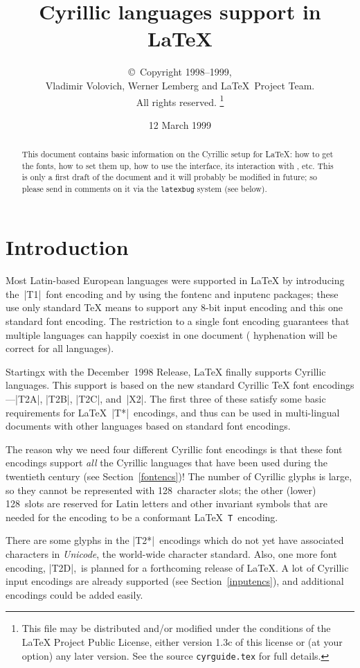 \documentclass{ltxguide}[1999/02/28]
\title{Cyrillic languages support in \LaTeX}
\author{\copyright~Copyright 1998--1999,\\ Vladimir Volovich,
        Werner Lemberg and \LaTeX\ Project Team.\\ All rights reserved.%
        \footnote{This file may be distributed and/or modified under the
          conditions of the \LaTeX{} Project Public License, either version 1.3c
          of this license or (at your option) any later version. See the source
         \texttt{cyrguide.tex} for full details.}%
}
\date{12 March 1999}
\begin{document}
\maketitle
\tableofcontents

\begin{abstract}
  This document contains basic information on the Cyrillic setup for
  \LaTeX{}: how to get the fonts, how to set them up, how to use
  the interface, its interaction with \babel{}, etc. This is only a first
  draft of the document and it will probably be modified in future; so
  please send in comments on it via the \texttt{latexbug} system
  (see below).
\end{abstract}


\section{Introduction}

Most Latin-based European languages were supported in \LaTeX{} by
introducing the~|T1|~font encoding and by using the \textsf{fontenc}
and \textsf{inputenc} packages; these use only standard \TeX{} means
to support any \mbox{8-bit} input encoding and this one standard font
encoding.  The restriction to a single font encoding guarantees that
multiple languages can happily coexist in one document (\eg
hyphenation will be correct for all languages).

Startingx with the December~1998 Release, \LaTeX{} finally supports
Cyrillic languages.  This support is based on the new standard
Cyrillic \TeX{} font encodings---|T2A|, |T2B|, |T2C|, and~|X2|.  The
first three of these satisfy some basic requirements for
\LaTeX{}~|T*|~encodings, and thus can be used in multi-lingual documents
with other languages based on standard font encodings.

The reason why we need four different Cyrillic font encodings is that
these font encodings support \emph{all} the Cyrillic languages that
have been used during the twentieth century (see
Section~\ref{fontencs})!  The number of Cyrillic glyphs is large, so
they cannot be represented with 128~character slots; the other (lower)
128~slots are reserved for Latin letters and other invariant symbols
that are needed for the encoding to be a conformant
\LaTeX{}~\texttt{T}~encoding.

There are some glyphs in the |T2*|~encodings which do not yet have
associated characters in \emph{Unicode}, the world-wide character
standard.  Also, one more font encoding, |T2D|,~is planned for a
forthcoming release of \LaTeX{}.  A lot of Cyrillic input encodings
are already supported (see Section~\ref{inputencs}), and additional
encodings could be added easily.
\end{document}
